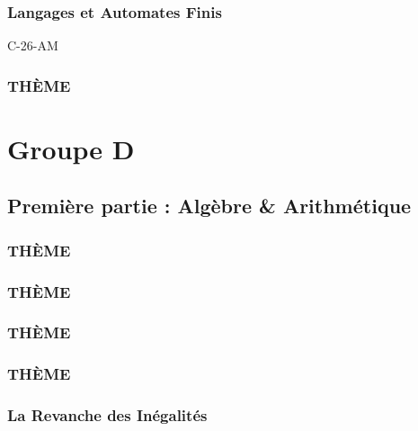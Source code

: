 \documentclass[poly,trombi]{valbonne}
\begin{document}
\subsection{Langages et Automates Finis}

{C-26-AM}

\subsection{THÈME}







\chapter{Groupe D}

\minitoc \clearpage

\section{Première partie : Algèbre \& Arithmétique}

\subsection{THÈME}


\subsection{THÈME}


\subsection{THÈME}


\subsection{THÈME}


\subsection{La Revanche des Inégalités}
\end{document}
